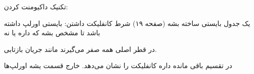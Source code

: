 تکنیک داکیومنت کردن:

یک جدول بایستی ساخته بشه (صفحه ۱۹)
شرط کانفلیکت داشتن: بایستی اورلپ داشته باشد تا مشخص بشه که داره یا نه

در قطر اصلی همه صفر می‌گیرند مانند جریان بازتابی.

در تقسیم باقی مانده داره کانفلیکت را نشان می‌دهد. خارج قسمت یشه اورلپ‌ها







